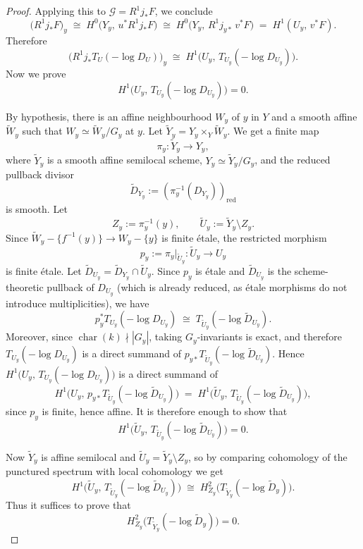 \documentclass[12pt,twoside,]{amsart}
\theoremstyle{plain}
\theoremstyle{definition}
\begin{document}
\begin{proof}
Applying this to \(\mathcal{G}=R^1j_*F\), we conclude
\[
\bigl(R^1j_*F\bigr)_y
\;\cong\;
H^0\bigl(Y_y,\,u^*R^1j_*F\bigr)
\;\cong\;
H^0\bigl(Y_y,\,R^1j_{y*}\,v^*F\bigr)
\;=\;
H^1(U_y,\,v^*F).
\]
Therefore
\[
\bigl(R^1j_*T_U(-\log D_U)\bigr)_y
\;\cong\;
H^1\bigl(U_y,\,T_{U_y}(-\log D_{U_y})\bigr).
\]
Now we prove
\[
H^1\bigl(U_y,\,T_{U_y}(-\log D_{U_y})\bigr)=0.
\]

By hypothesis, there is an affine neighbourhood $W_y$ of $y$ in $Y$
and a smooth affine $\widetilde{W}_y$ such that
$W_y\simeq \widetilde W_y/G_y$ at $y$.
Let $\widetilde{Y}_y = Y_y \times_Y \widetilde{W}_y$. We get a finite map
\[
\pi_y:\widetilde Y_y\longrightarrow Y_y,
\]
where $\widetilde Y_y$ is a smooth affine semilocal scheme,
$Y_y\simeq \widetilde Y_y/G_y$, and the reduced pullback divisor
\[
\widetilde D_{Y_y}:=(\pi_y^{-1}(D_{Y_y}))_{\operatorname{red}}
\]
is smooth. Let
\[
Z_y:=\pi_y^{-1}(y),
\qquad
\widetilde U_y:=\widetilde Y_y\setminus Z_y.
\]
Since $\widetilde{W}_y- \{f^{-1}(y)\} \to W_y- \{y\}$ is finite \'etale,
the restricted morphism
\[
p_y:=\pi_y|_{\widetilde U_y}:\widetilde U_y\longrightarrow U_y
\]
is finite \'etale. Let
$\widetilde D_{U_y} = \widetilde D_{Y_y} \cap \widetilde U_y$.
Since $p_y$ is \'etale and $\widetilde D_{U_y}$ is the scheme-theoretic
pullback of $D_{U_y}$ (which is already reduced, as \'etale morphisms
do not introduce multiplicities), we have
\[
p_y^*T_{U_y}(-\log D_{U_y})
\;\cong\;
T_{\widetilde U_y}(-\log \widetilde D_{U_y}).
\]
Moreover, since $\operatorname{char}(k)\nmid |G_y|$, taking
$G_y$-invariants is exact, and therefore
$T_{U_y}(-\log D_{U_y})$ is a direct summand of
$p_{y*}T_{\widetilde U_y}(-\log \widetilde D_{U_y})$.
Hence
$H^1\bigl(U_y,\,T_{U_y}(-\log D_{U_y})\bigr)$
is a direct summand of
\[
H^1\bigl(U_y,\,
p_{y*}T_{\widetilde U_y}(-\log \widetilde D_{U_y})\bigr)
\;=\;
H^1\bigl(\widetilde U_y,\,
T_{\widetilde U_y}(-\log \widetilde D_{U_y})\bigr),
\]
since $p_y$ is finite, hence affine.
It is therefore enough to show that
\[
H^1\bigl(\widetilde U_y,\,
T_{\widetilde U_y}(-\log \widetilde D_{U_y})\bigr)=0.
\]

Now $\widetilde Y_y$ is affine semilocal and
$\widetilde U_y=\widetilde Y_y\setminus Z_y$, so by comparing
cohomology of the punctured spectrum with local cohomology we get
\[
H^1\bigl(\widetilde U_y,\,
T_{\widetilde U_y}(-\log \widetilde D_{U_y})\bigr)
\;\cong\;
H^2_{Z_y}\bigl(
T_{\widetilde Y_y}(-\log \widetilde D_y)\bigr).
\]
Thus it suffices to prove that
\[
H^2_{Z_y}\bigl(
T_{\widetilde Y_y}(-\log \widetilde D_y)\bigr)=0.
\]


\end{proof}
\end{document}
